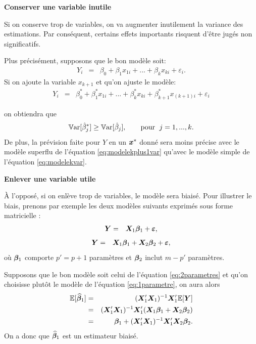 \textbf{Conserver une variable inutile}

Si on conserve trop de variables, on va augmenter inutilement la variance des estimations. Par conséquent, certains effets importants risquent d'être jugés non significatifs.

Plus précisément, supposons que le bon modèle soit:
\begin{eqnarray}
Y_i &=& \beta_0+\beta_1 x_{1i}+...+\beta_k x_{ki}+ \varepsilon_i.
\label{eq:modelekvar}
\end{eqnarray}
Si on ajoute la variable $x_{k+1}$ et qu'on ajuste le modèle:
\begin{eqnarray}
\label{eq:modelekplus1var}
  Y_i &=& \beta_0^*+\beta_1^* x_{1i}+...+\beta_k^* x_{ki}+ \beta_{k+1}^* x_{(k+1)i}+ \varepsilon_i
\end{eqnarray}

on obtiendra que $$\mathbb{V}\text{ar}[\hat\beta^*_j] \geq \mathbb{V}\text{ar}[\hat\beta_j],\qquad\text{pour } \;j=1,...,k.$$
De plus, la prévision faite pour $Y$ en un ${\bm{x}}^*$ donné sera moins précise avec le modèle superflu de l'équation \eqref{eq:modelekplus1var} qu'avec le modèle simple de l'équation \eqref{eq:modelekvar}.

\textbf{Enlever une variable utile}

À l'opposé, si on enlève trop de variables, le modèle sera biaisé. Pour illustrer le biais, prenons par exemple les deux modèles suivants exprimés sous forme matricielle :
\begin{eqnarray}
  \bm{Y} &=& \bm{X}_1\bm\beta_1 + \bm\varepsilon,
  \label{eq:1parametre}
  \end{eqnarray}
  \begin{eqnarray}
  \bm{Y} &=& \bm{X}_1\bm\beta_1 +\bm{X}_2\bm\beta_2 +\bm\varepsilon,
  \label{eq:2parametres}
\end{eqnarray}
où $\bm\beta_1$ comporte $p'=p+1$ paramètres et $\bm\beta_2$ inclut $m-p'$ paramètres.

Supposons que le bon modèle soit celui de l'équation \eqref{eq:2parametres} et qu'on choisisse plutôt le modèle de l'équation \eqref{eq:1parametre}, on aura alors
\begin{eqnarray*}
  \mathbb{E}[\widehat{\bm\beta}_1] &=& (\bm{X}_1'\bm{X}_1)^{-1}\bm{X}_1'\mathbb{E}[\bm{Y}] \\
  &=&  (\bm{X}_1'\bm{X}_1)^{-1}\bm{X}_1' (\bm{X}_1\bm\beta_1 + \bm{X}_2\bm\beta_2)\\
  &=& \bm\beta_1 + (\bm{X}_1'\bm{X}_1)^{-1}\bm{X}_1'\bm{X}_2 \bm\beta_2.
\end{eqnarray*}
On a donc que $\widehat{\bm\beta}_1$ est un estimateur biaisé.

